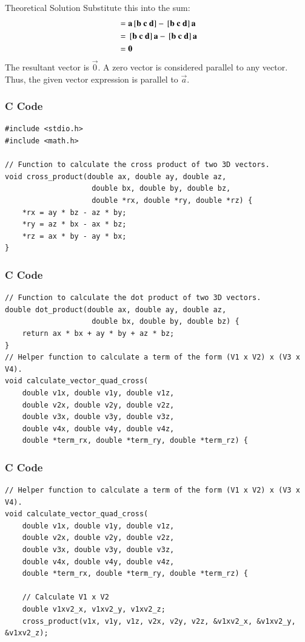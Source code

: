 \documentclass{beamer}
\begin{document}
\begin{frame}{Theoretical Solution}
Substitute this into the sum:
\begin{align}
&= \vec{a}\sbrak{\vec{b} \ \vec{c} \ \vec{d}} - \sbrak{\vec{b} \ \vec{c} \ \vec{d}}\vec{a} \\
&= \sbrak{\vec{b} \ \vec{c} \ \vec{d}}\vec{a} - \sbrak{\vec{b} \ \vec{c} \ \vec{d}}\vec{a} \\
&= \vec{0}
\end{align}
The resultant vector is $\vec{0}$.
A zero vector is considered parallel to any vector.
Thus, the given vector expression is parallel to $\vec{a}$.
\end{frame}

\begin{frame}[fragile]
\frametitle{C Code}
\begin{lstlisting}
#include <stdio.h>
#include <math.h>

// Function to calculate the cross product of two 3D vectors.
void cross_product(double ax, double ay, double az,
                    double bx, double by, double bz,
                    double *rx, double *ry, double *rz) {
    *rx = ay * bz - az * by;
    *ry = az * bx - ax * bz;
    *rz = ax * by - ay * bx;
}
\end{lstlisting}
\end{frame}

\begin{frame}[fragile]
\frametitle{C Code}
\begin{lstlisting}
// Function to calculate the dot product of two 3D vectors.
double dot_product(double ax, double ay, double az,
                    double bx, double by, double bz) {
    return ax * bx + ay * by + az * bz;
}
// Helper function to calculate a term of the form (V1 x V2) x (V3 x V4).
void calculate_vector_quad_cross(
    double v1x, double v1y, double v1z,
    double v2x, double v2y, double v2z,
    double v3x, double v3y, double v3z,
    double v4x, double v4y, double v4z,
    double *term_rx, double *term_ry, double *term_rz) {
\end{lstlisting}
\end{frame}

\begin{frame}[fragile]
\frametitle{C Code}
\begin{lstlisting}
// Helper function to calculate a term of the form (V1 x V2) x (V3 x V4).
void calculate_vector_quad_cross(
    double v1x, double v1y, double v1z,
    double v2x, double v2y, double v2z,
    double v3x, double v3y, double v3z,
    double v4x, double v4y, double v4z,
    double *term_rx, double *term_ry, double *term_rz) {

    // Calculate V1 x V2
    double v1xv2_x, v1xv2_y, v1xv2_z;
    cross_product(v1x, v1y, v1z, v2x, v2y, v2z, &v1xv2_x, &v1xv2_y, &v1xv2_z);
    \end{lstlisting}
\end{frame}
\end{document}
